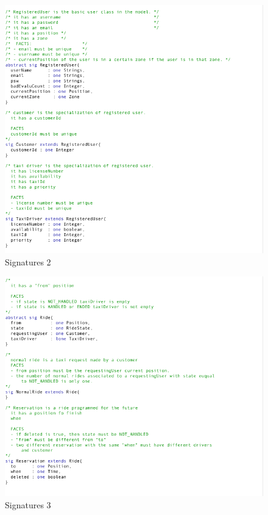 				\begin{figure}[H]
					\centering
					\includegraphics[width=\textwidth, scale=0.5]{IMG/ALLOY/SIG_2.png}
					\caption{Signatures 2}\label{sec:FigureSignatures2}
				\end{figure}

				\begin{figure}[H]
					\centering
					\includegraphics[width=\textwidth, scale=0.5]{IMG/ALLOY/SIG_3.png}
					\caption{Signatures 3}\label{sec:FigureSignatures3}
				\end{figure}

